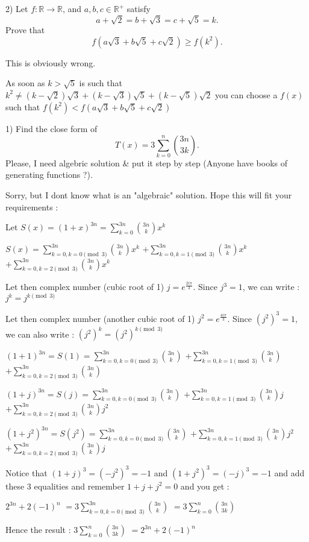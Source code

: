 \begin{solution}
	\begin{tcolorbox} 2) Let $ f: \mathbb{R} \to \mathbb{R}$, and $ a,b,c \in \mathbb{R}^ +$ satisfy
\[ a + \sqrt 2 = b + \sqrt 3 = c + \sqrt 5 = k.
\]
Prove that
\[ f\left(a\sqrt 3 + b\sqrt 5 + c\sqrt 2 \right) \ge f(k^2).
\]
\end{tcolorbox}

This is obviously wrong.

As soon as $ k>\sqrt 5$ is such that $ k^2\neq (k-\sqrt 2)\sqrt 3 + (k-\sqrt 3)\sqrt 5 + (k-\sqrt 5)\sqrt 2$ you can choose a $ f(x)$ such that  $ f(k^2)< f(a\sqrt 3 + b\sqrt 5 + c\sqrt 2)$
\end{solution}



\begin{solution}
	\begin{tcolorbox}1) Find the close form of
\[ T(x) = 3 \sum_{k = 0}^{n} \binom{3n}{3k}.
\]
Please, I need algebric solution & put it step by step (Anyone have books of generating functions ?).
\end{tcolorbox}

Sorry, but I dont know what is an "algebraic" solution. Hope this will fit your requirements :

Let $ S(x) = (1 + x)^{3n} = \sum_{k = 0}^{3n}\binom{3n}{k}x^{k}$

$ S(x) = \sum_{k = 0,k = 0\pmod 3}^{3n}\binom{3n}{k}x^{k}$ $ + \sum_{k = 0,k = 1\pmod 3}^{3n}\binom{3n}{k}x^{k}$ $ + \sum_{k = 0,k = 2\pmod 3}^{3n}\binom{3n}{k}x^{k}$

Let then complex number (cubic root of 1) $ j = e^{\frac {2i\pi}{3}}$. Since $ j^3 = 1$, we can write : $ j^{k} = j^{k\pmod 3}$

Let then complex number (another cubic root of 1) $ j^2 = e^{\frac {4i\pi}{3}}$. Since $ (j^2)^3 = 1$, we can also write : $ (j^2)^{k} = (j^2)^{k\pmod 3}$

$ (1 + 1)^{3n} = S(1) = \sum_{k = 0,k = 0\pmod 3}^{3n}\binom{3n}{k}$ $ + \sum_{k = 0,k = 1\pmod 3}^{3n}\binom{3n}{k}$ $ + \sum_{k = 0,k = 2\pmod 3}^{3n}\binom{3n}{k}$

$ (1 + j)^{3n} = S(j) = \sum_{k = 0,k = 0\pmod 3}^{3n}\binom{3n}{k}$ $ + \sum_{k = 0,k = 1\pmod 3}^{3n}\binom{3n}{k}j$ $ + \sum_{k = 0,k = 2\pmod 3}^{3n}\binom{3n}{k}j^2$

$ (1 + j^2)^{3n} = S(j^2) = \sum_{k = 0,k = 0\pmod 3}^{3n}\binom{3n}{k}$ $ + \sum_{k = 0,k = 1\pmod 3}^{3n}\binom{3n}{k}j^2$ $ + \sum_{k = 0,k = 2\pmod 3}^{3n}\binom{3n}{k}j$

Notice that $ (1 + j)^3 = ( - j^2)^3 = - 1$ and $ (1 + j^2)^3 = ( - j)^3 = - 1$ and add these 3 equalities and remember $ 1 + j + j^2 = 0$ and you get :

$ 2^{3n} + 2( - 1)^n$ $ = 3\sum_{k = 0,k = 0\pmod 3}^{3n}\binom{3n}{k}$ $ = 3\sum_{k = 0}^{n}\binom{3n}{3k}$


Hence the result : $ 3\sum_{k = 0}^{n}\binom{3n}{3k}$ $ = 2^{3n} + 2( - 1)^n$
\end{solution}



